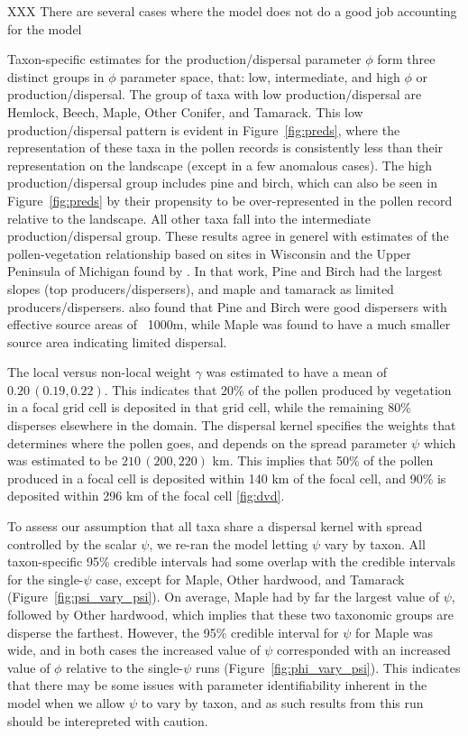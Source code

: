 \documentclass[12pt]{article}
\begin{document}
XXX There are several cases where the model does not do a good job accounting for the model   

Taxon-specific estimates for the production/dispersal parameter $\phi$
form three distinct groups in $\phi$ parameter space, that: low,
intermediate, and high $\phi$ or production/dispersal. The group of
taxa with low production/dispersal are Hemlock, Beech, Maple, Other
Conifer, and Tamarack. This low production/dispersal pattern is
evident in Figure~\ref{fig:preds}, where the representation of these
taxa in the pollen records is consistently less than their
representation on the landscape (except in a few anomalous cases). The
high production/dispersal group includes pine and birch, which can
also be seen in Figure~\ref{fig:preds} by their propensity to be
over-represented in the pollen record relative to the landscape. All
other taxa fall into the intermediate production/dispersal
group. These results agree in generel with estimates of the
pollen-vegetation relationship based on sites in Wisconsin and the
Upper Peninsula of Michigan found by \cite{prentice1986}. In that
work, Pine and Birch had the largest slopes (top
producers/dispersers), and maple and tamarack as limited
producers/dispersers. \cite{jackson1990} also found that Pine and
Birch were good dispersers with effective source areas of ~1000m,
while Maple was found to have a much smaller source area indicating
limited dispersal.

The local versus non-local weight $\gamma$ was estimated to have a
mean of $0.20\,(0.19, 0.22)$. This indicates that 20\% of the pollen
produced by vegetation in a focal grid cell is deposited in that grid
cell, while the remaining 80\% disperses elsewhere in the domain. The
dispersal kernel specifies the weights that determines where the
pollen goes, and depends on the spread parameter $\psi$ which was
estimated to be $210\,(200, 220)$ km. This implies that 50\% of the
pollen produced in a focal cell is deposited within 140 km of the
focal cell, and 90\% is deposited within 296 km of the focal cell \ref{fig:dvd}.

To assess our assumption that all taxa share a dispersal kernel with
spread controlled by the scalar $\psi$, we re-ran the model letting
$\psi$ vary by taxon. All taxon-specific 95\% credible intervals had
some overlap with the credible intervals for the single-$\psi$ case,
except for Maple, Other hardwood, and Tamarack
(Figure~\ref{fig:psi_vary_psi}). On average, Maple had by far the
largest value of $\psi$, followed by Other hardwood, which implies
that these two taxonomic groups are disperse the farthest. However,
the 95\% credible interval for $\psi$ for Maple was wide, and in both
cases the increased value of $\psi$ corresponded with an increased
value of $\phi$ relative to the single-$\psi$ runs
(Figure~\ref{fig:phi_vary_psi}). This indicates that there may be
some issues with parameter identifiability inherent in the model when
we allow $\psi$ to vary by taxon, and as such results from this run
should be interepreted with caution.




\end{document}
